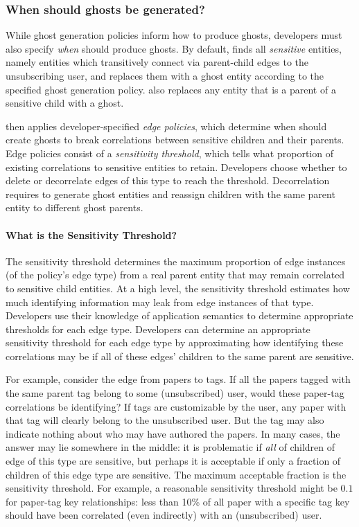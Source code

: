 \subsubsection{When should ghosts be generated?}
\label{design:edgepol}
While ghost generation policies inform \sys how to produce ghosts, developers must also specify
\emph{when} \sys should produce ghosts. 
By default, \sys finds all \emph{sensitive} entities,
namely entities which transitively connect via parent-child edges to the unsubscribing user, and
replaces them with a ghost entity according to the specified ghost generation policy. \sys also
replaces any entity that is a parent of a sensitive child with a ghost.

\sys then applies developer-specified \emph{edge policies}, which determine when \sys should
create ghosts to break correlations between sensitive children and their parents.
Edge policies consist of a \emph{sensitivity threshold}, which tells \sys what
proportion of existing correlations to sensitive entities to retain. Developers choose
whether to delete or decorrelate edges of this type to reach the threshold. Decorrelation requires
\sys to generate ghost entities and reassign children with the same parent entity to different
ghost parents.

\paragraph{What is the Sensitivity Threshold?}
%
The sensitivity threshold determines the maximum proportion of edge instances (of the policy's edge
type) from a real parent entity that may remain correlated to sensitive child entities.
At a high level, the sensitivity threshold estimates how much identifying information may leak from
edge instances of that type.  Developers use their knowledge of application semantics to determine
appropriate thresholds for each edge type.  Developers can determine an appropriate sensitivity
threshold for each edge type by approximating how identifying these correlations may be if
all of these edges' children to the same parent are sensitive.

For example, consider the edge from papers to tags. If all the papers tagged with the same parent
tag belong to some (unsubscribed) user, would these paper-tag correlations be identifying? If tags
are customizable by the user, any paper with that tag will clearly belong to the unsubscribed user.
But the tag may also indicate nothing about who may have authored the papers.  In many cases, the
answer may lie somewhere in the middle: it is problematic if \emph{all} of children of edge of this
type are sensitive, but perhaps it is acceptable if only a fraction of children of this edge type
are sensitive. The maximum acceptable fraction is the sensitivity threshold. For example, a
reasonable sensitivity threshold might be $0.1$ for paper-tag key relationships: less than 10\% of
all paper with a specific tag key should have been correlated (even indirectly) with an
(unsubscribed) user. 

